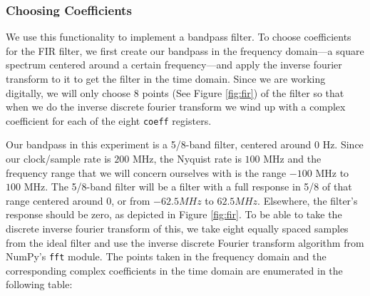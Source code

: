 \documentclass[12pt]{article}
\begin{document}
\subsubsection{Choosing Coefficients}
We use this functionality to implement a bandpass filter. To choose coefficients for the FIR filter, we first create our bandpass in the frequency domain---a square spectrum centered around a certain frequency---and apply the inverse fourier transform to it to get the filter in the time domain. Since we are working digitally, we will only choose 8 points (See Figure \ref{fig:fir}) of the filter so that when we do the inverse discrete fourier transform we wind up with a complex coefficient for each of the eight \texttt{coeff} registers.

Our bandpass in this experiment is a 5/8-band filter, centered around $0$ Hz. Since our clock/sample rate is $200$ MHz, the Nyquist rate is $100$ MHz and the frequency range that we will concern ourselves with is the range $-100$ MHz to $100$ MHz. The 5/8-band filter will be a filter with a full response in 5/8 of that range centered around 0, or from $-62.5MHz$ to $62.5 MHz$. Elsewhere, the filter's response should be zero, as depicted in Figure \ref{fig:fir}. To be able to take the discrete inverse fourier transform of this, we take eight equally spaced samples from the ideal filter and use the inverse discrete Fourier transform algorithm from NumPy's \texttt{fft} module. The points taken in the frequency domain and the corresponding complex coefficients in the time domain are enumerated in the following table:
\end{document}
